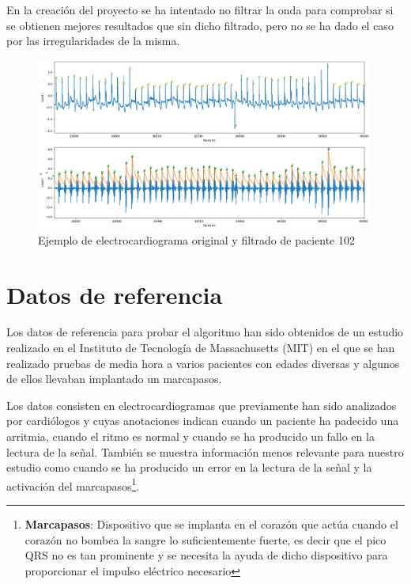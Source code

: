En la creación del proyecto se ha intentado no filtrar la onda para comprobar si se obtienen mejores resultados que sin dicho filtrado, pero no se ha dado el caso por las irregularidades de la misma.

\begin{figure}[h!]
	\centering
	\includegraphics[width=0.99\textwidth]{./Images/img_introduccion/102filtrado_y_sin_filtrar.png}
	\caption{Ejemplo de electrocardiograma original y filtrado de paciente 102}
	\label{fig:102filtradoysinfiltrar}
\end{figure}

\section{Datos de referencia}
Los datos de referencia para probar el algoritmo han sido obtenidos de un estudio realizado en el Instituto de Tecnología de Massachusetts (MIT) \cite{MIT} en el que se han realizado pruebas de media hora a varios pacientes con edades diversas y algunos de ellos llevaban implantado un marcapasos.

Los datos consisten en electrocardiogramas que previamente han sido analizados por cardiólogos y cuyas anotaciones indican cuando un paciente ha padecido una arritmia, cuando el ritmo es normal y cuando se ha producido un fallo en la lectura de la señal. También se muestra información menos relevante para nuestro 
estudio como cuando se ha producido un error en la lectura de la señal y la activación del marcapasos\footnote{\textbf{Marcapasos}: Dispositivo que se implanta en el corazón que actúa cuando el corazón no bombea la sangre lo suficientemente fuerte, es decir que el pico QRS no es tan prominente
y se necesita la ayuda de dicho dispositivo para proporcionar el impulso eléctrico necesario}.

